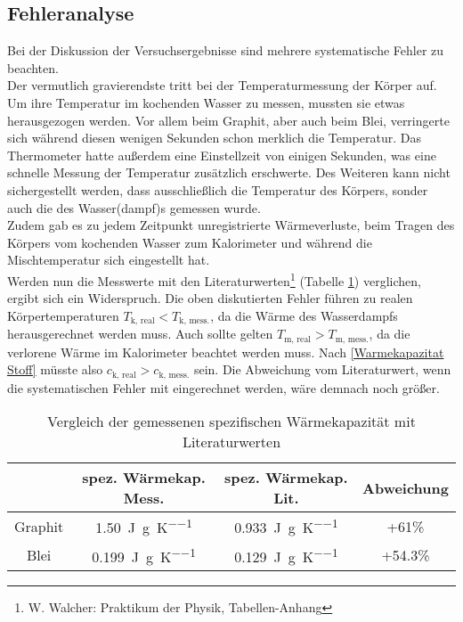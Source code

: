 \subsection{Fehleranalyse}
Bei der Diskussion der Versuchsergebnisse sind mehrere systematische Fehler zu beachten. \\
Der vermutlich gravierendste tritt bei der Temperaturmessung der Körper auf. Um ihre Temperatur im kochenden Wasser zu messen, mussten sie etwas herausgezogen werden. Vor allem beim Graphit, aber auch beim Blei, verringerte sich während diesen wenigen Sekunden schon merklich die Temperatur. Das Thermometer hatte außerdem eine Einstellzeit von einigen Sekunden, was eine schnelle Messung der Temperatur zusätzlich erschwerte. Des Weiteren kann nicht sichergestellt werden, dass ausschließlich die Temperatur des Körpers, sonder auch die des Wasser(dampf)s  gemessen wurde. \\
Zudem gab es zu jedem Zeitpunkt unregistrierte Wärmeverluste, beim Tragen des Körpers vom kochenden Wasser zum Kalorimeter und während die Mischtemperatur sich eingestellt hat. \\


Werden nun die Messwerte mit den Literaturwerten\footnote{W. Walcher: \glqq Praktikum der Physik\grqq, Tabellen-Anhang} (Tabelle \ref{spez. Warmekap. Literatur}) verglichen, ergibt sich ein Widerspruch. Die oben diskutierten Fehler führen zu realen Körpertemperaturen $T_\text{k, real}<T_\text{k, mess.}$, da die Wärme des Wasserdampfs herausgerechnet werden muss. Auch sollte gelten $T_\text{m, real}>T_\text{m, mess.}$, da die verlorene Wärme im Kalorimeter beachtet werden muss. Nach \eqref{Warmekapazitat Stoff} müsste also $c_\text{k, real}>c_\text{k, mess.}$ sein. Die Abweichung vom Literaturwert, wenn die systematischen Fehler mit eingerechnet werden, wäre demnach noch größer. \\

\begin{table}[h]
	\begin{center}
		\begin{tabular}{c | c | c | c}
			& spez. Wärmekap. Mess. & spez. Wärmekap. Lit. & Abweichung \\
			\hline
			Graphit & \SI{1.50}{\joule\per\gram\per\kelvin} & \SI{0.933}{\joule\per\gram\per\kelvin} & +61\% \\
			Blei & \SI{0.199}{\joule\per\gram\per\kelvin} & \SI{0.129}{\joule\per\gram\per\kelvin} & +54.3\%
		\end{tabular}
		\caption{Vergleich der gemessenen spezifischen Wärmekapazität mit Literaturwerten}
		\label{spez. Warmekap. Literatur}
	\end{center}
\end{table}

